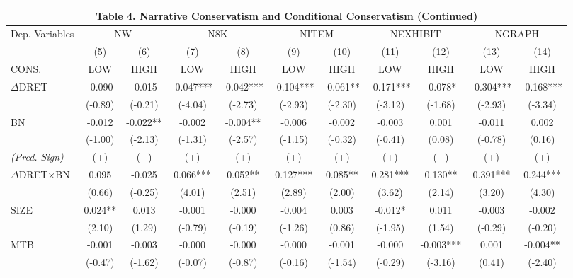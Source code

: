 \begin{table}[H]
	\begin{center}
		\tabcolsep=0.11cm
		\begin{tabular}{lcccccccccc}
			\multicolumn{11}{c}{\textbf{Table 4. Narrative Conservatism and Conditional Conservatism (Continued)}} \\
			\toprule
			\toprule
			Dep. Variables & \multicolumn{2}{c}{NW} & \multicolumn{2}{c}{N8K} & \multicolumn{2}{c}{NITEM} & \multicolumn{2}{c}{NEXHIBIT} & \multicolumn{2}{c}{NGRAPH} \\
			\cmidrule{2-11}
			& (5) & (6) & (7) & (8) & (9) & (10) & (11) & (12) & (13) & (14) \\
			CONS. & LOW & HIGH & LOW & HIGH & LOW & HIGH & LOW & HIGH& LOW & HIGH\\
			\midrule
			$\Delta$DRET & -0.090 & -0.015 & -0.047*** & -0.042*** & -0.104*** & -0.061** & -0.171*** & -0.078* & -0.304*** & -0.168*** \\
			& (-0.89) & (-0.21) & (-4.04) & (-2.73) & (-2.93) & (-2.30) & (-3.12) & (-1.68) & (-2.93) & (-3.34) \\
			BN & -0.012 & -0.022** & -0.002 & -0.004** & -0.006 & -0.002 & -0.003 & 0.001 & -0.011 & 0.002 \\
			& (-1.00) & (-2.13) & (-1.31) & (-2.57) & (-1.15) & (-0.32) & (-0.41) & (0.08) & (-0.78) & (0.16) \\
			\rowcolor[rgb]{ .906,  .902,  .902} \textit{(Pred. Sign)} & (+) & (+) & (+) & (+) & (+) & (+) & (+) & (+) & (+) & (+) \\
			\rowcolor[rgb]{ .906,  .902,  .902} $\Delta$DRET$\times$BN & 0.095 & -0.025 & 0.066*** & 0.052** & 0.127*** & 0.085** & 0.281*** & 0.130** & 0.391*** & 0.244*** \\
			\rowcolor[rgb]{ .906,  .902,  .902} & (0.66) & (-0.25) & (4.01) & (2.51) & (2.89) & (2.00) & (3.62) & (2.14) & (3.20) & (4.30) \\
			SIZE & 0.024** & 0.013 & -0.001 & -0.000 & -0.004 & 0.003 & -0.012* & 0.011 & -0.003 & -0.002 \\
			& (2.10) & (1.29) & (-0.79) & (-0.19) & (-1.26) & (0.86) & (-1.95) & (1.54) & (-0.29) & (-0.20) \\
			MTB & -0.001 & -0.003 & -0.000 & -0.000 & -0.000 & -0.001 & -0.000 & -0.003*** & 0.001 & -0.004** \\
			& (-0.47) & (-1.62) & (-0.07) & (-0.87) & (-0.16) & (-1.54) & (-0.29) & (-3.16) & (0.41) & (-2.40) \\

\end{tabular}
\end{center}
\end{table}
